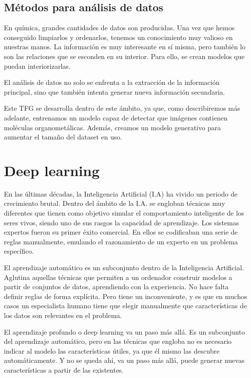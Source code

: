 \subsection{Métodos para análisis de datos}
En química, grandes cantidades de datos son producidas. Una vez que hemos conseguido limpiarlos y ordenarlos, tenemos un conocimiento muy valioso en nuestras manos. La información es muy interesante en sí misma, pero también lo son las relaciones que se esconden en su interior. Para ello, se crean modelos que puedan interiorizarlas.

El análisis de datos no solo se enfrenta a la extracción de la información principal, sino que también intenta generar nueva información secundaria. \cite{doi:10.1021/ci600234z}

Este TFG se desarrolla dentro de este ámbito, ya que, como describiremos más adelante, entrenamos un modelo capaz de detectar que imágenes contienen moléculas organometálicas. Además, creamos un modelo generativo para aumentar el tamaño del dataset en uso.

\newpage
\section{Deep learning}
En las últimas décadas, la Inteligencia Artificial (I.A) ha vivido un periodo de crecimiento brutal. Dentro del ámbito de la I.A. se engloban técnicas muy diferentes que tienen como objetivo simular el comportamiento inteligente de los seres vivos, siendo uno de sus rasgos la capacidad de aprendizaje. Los sistemas expertos fueron su primer éxito comercial. En ellos se codificaban una serie de reglas manualmente, emulando el razonamiento de un experto en un problema específico.

El aprendizaje automático es un subconjunto dentro de la Inteligencia Artificial. Aglutina aquellas técnicas que permiten a un ordenador construir modelos a partir de conjuntos de datos, aprendiendo con la experiencia. No hace falta definir reglas de forma explícita. Pero tiene un inconveniente, y es que en muchos casos un especialista humano tiene que elegir manualmente que características de los datos son relevantes en el problema.

El aprendizaje profundo o deep learning va un paso más allá. Es un subconjunto del aprendizaje automático, pero en las técnicas que engloba no es necesario indicar al modelo  las características útiles, ya que él mismo las descubre automáticamente. Y no se queda ahí, va un paso más allá, puede generar nuevas características a partir de las existentes.

